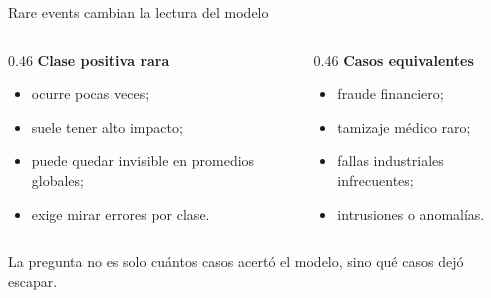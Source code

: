 \documentclass[aspectratio=169,12pt]{beamer}
\newcommand{\colhead}[1]{\textbf{#1}\par\vspace{2pt}}
\begin{document}
\begin{frame}{Rare events cambian la lectura del modelo}
  \begin{columns}[T]
    \begin{column}{0.46\textwidth}
      \colhead{\large Clase positiva rara}
      \begin{itemize}\large
        \item ocurre pocas veces;
        \item suele tener alto impacto;
        \item puede quedar invisible en promedios globales;
        \item exige mirar errores por clase.
      \end{itemize}
    \end{column}
    \begin{column}{0.46\textwidth}
      \colhead{\large Casos equivalentes}
      \begin{itemize}\large
        \item fraude financiero;
        \item tamizaje médico raro;
        \item fallas industriales infrecuentes;
        \item intrusiones o anomalías.
      \end{itemize}
    \end{column}
  \end{columns}
  \vspace{6pt}
  \begin{center}
    La pregunta no es solo cuántos casos acertó el modelo, sino qué casos dejó escapar.
  \end{center}
\end{frame}
\end{document}
